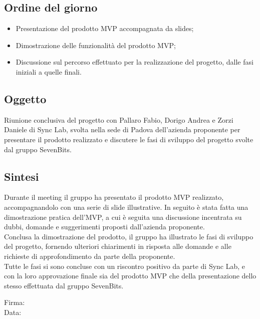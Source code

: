 \documentclass[10pt]{article}
\begin{document}
\subsection{Ordine del giorno}
\begin{itemize}
    \item Presentazione del prodotto MVP accompagnata da slides;
    \item Dimostrazione delle funzionalità del prodotto MVP;
    \item Discussione sul percorso effettuato per la realizzazione del progetto, dalle fasi iniziali a quelle finali.
\end{itemize}

\subsection{Oggetto}
Riunione conclusiva del progetto con Pallaro Fabio, Dorigo Andrea e Zorzi Daniele di Sync Lab, svolta nella sede di Padova dell'azienda proponente
per presentare il prodotto realizzato e discutere le fasi di sviluppo del progetto svolte dal gruppo SevenBits.

\subsection{Sintesi}
Durante il meeting il gruppo ha presentato il prodotto MVP realizzato, accompagnandolo con una serie di slide illustrative. In seguito è stata fatta una dimostrazione pratica
dell'MVP, a cui è seguita una discussione incentrata su dubbi, domande e suggerimenti proposti dall'azienda proponente.\\
Conclusa la dimostrazione del prodotto, il gruppo ha illustrato le fasi di sviluppo del progetto, fornendo ulteriori chiarimenti in risposta alle domande e alle richieste di approfondimento da parte 
della proponente.\\
Tutte le fasi si sono concluse con un riscontro positivo da parte di Sync Lab, e con la loro approvazione finale sia del prodotto MVP che della presentazione dello stesso
effettuata dal gruppo SevenBits.\\


\vfill
\begin{minipage}{10cm}
Firma: \hrulefill \\
\vspace{2mm}
Data: \dotfill
\end{minipage}
\end{document}
